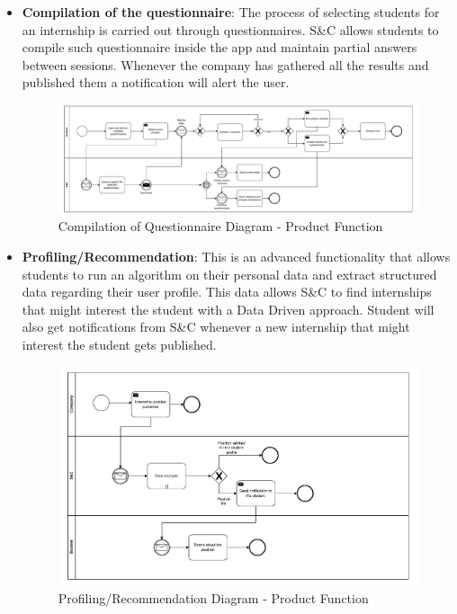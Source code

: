 \begin{itemize}
      \item \textbf{Compilation of the questionnaire}: The process of selecting students for an internship is carried
            out through questionnaires. S\&C allows students to compile such questionnaire inside the app and maintain
            partial answers between sessions. Whenever the company has gathered all the results and published them a
            notification will alert the user.

            \begin{figure}[H]
                  \centering
                  \includegraphics[width=1.0\textwidth]{Images/BPMN_5.pdf}
                  \caption{Compilation of Questionnaire Diagram - Product Function}
                  \label{fig:compilation_of_the_questionnaire_diagram}
            \end{figure}
      \item \textbf{Profiling/Recommendation}: This is an advanced functionality that allows students to run an
            algorithm on their personal data and extract structured data regarding their user profile. This data allows
            S\&C to find internships that might interest the student with a Data Driven approach. Student will also get
            notifications from S\&C whenever a new internship that might interest the student gets published.

            \begin{figure}[H]
                  \centering
                  \includegraphics[width=1.0\textwidth]{Images/BPMN_6.pdf}
                  \caption{Profiling/Recommendation Diagram - Product Function}
                  \label{fig:profiling_recommendation_diagram}
            \end{figure}

\end{itemize}

